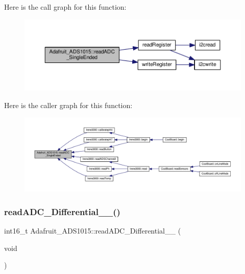 Here is the call graph for this function\+:
\nopagebreak
\begin{figure}[H]
\begin{center}
\leavevmode
\includegraphics[width=350pt]{df/df6/class_adafruit___a_d_s1015_a40f38b9e1f3ec397c0670dd632510235_cgraph}
\end{center}
\end{figure}
Here is the caller graph for this function\+:
\nopagebreak
\begin{figure}[H]
\begin{center}
\leavevmode
\includegraphics[width=350pt]{df/df6/class_adafruit___a_d_s1015_a40f38b9e1f3ec397c0670dd632510235_icgraph}
\end{center}
\end{figure}
\mbox{\label{class_adafruit___a_d_s1015_a56582333958e66efaccd3d4a8a47e3ff}} 
\subsubsection{\texorpdfstring{read\+A\+D\+C\+\_\+\+Differential\+\_\+\_()}{readADC\_Differential\_0\_1()}}
{\footnotesize\ttfamily int16\+\_\+t Adafruit\+\_\+\+A\+D\+S1015\+::read\+A\+D\+C\+\_\+\+Differential\+\_\+\_ (\begin{DoxyParamCaption}\item[{void}]{ }\end{DoxyParamCaption})}



